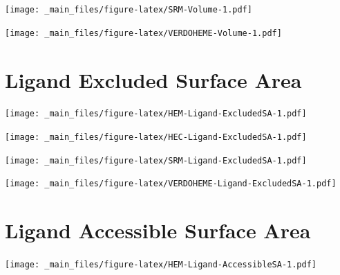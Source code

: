 \documentclass[a4paper, nobind]{templates/ociamthesis}
\let\origfigure\figure
\let\endorigfigure\endfigure
\renewenvironment{figure}[1][2] {
    \expandafter\origfigure\expandafter[H]
} {
    \endorigfigure
}
\begin{document}
\begin{figure}
\centering
\texttt{[image: \_main\_files/figure-latex/SRM-Volume-1.pdf]}
\caption{\label{fig:SRM-Volume}SRM: Volume}
\end{figure}

\begin{figure}
\centering
\texttt{[image: \_main\_files/figure-latex/VERDOHEME-Volume-1.pdf]}
\caption{\label{fig:VERDOHEME-Volume}VERDOHEME: Volume}
\end{figure}

\hypertarget{figs-ligExcSA}{%
\section{Ligand Excluded Surface Area}\label{figs-ligExcSA}}

\begin{figure}
\centering
\texttt{[image: \_main\_files/figure-latex/HEM-Ligand-ExcludedSA-1.pdf]}
\caption{\label{fig:HEM-Ligand-ExcludedSA}HEM: Ligand Excluded Suface Area}
\end{figure}

\begin{figure}
\centering
\texttt{[image: \_main\_files/figure-latex/HEC-Ligand-ExcludedSA-1.pdf]}
\caption{\label{fig:HEC-Ligand-ExcludedSA}HEC: Ligand Excluded Suface Area}
\end{figure}

\begin{figure}
\centering
\texttt{[image: \_main\_files/figure-latex/SRM-Ligand-ExcludedSA-1.pdf]}
\caption{\label{fig:SRM-Ligand-ExcludedSA}SRM: Ligand Excluded Suface Area}
\end{figure}

\begin{figure}
\centering
\texttt{[image: \_main\_files/figure-latex/VERDOHEME-Ligand-ExcludedSA-1.pdf]}
\caption{\label{fig:VERDOHEME-Ligand-ExcludedSA}VERDOHEME: Ligand Excluded Suface Area}
\end{figure}

\hypertarget{figs-ligAccSA}{%
\section{Ligand Accessible Surface Area}\label{figs-ligAccSA}}

\begin{figure}
\centering
\texttt{[image: \_main\_files/figure-latex/HEM-Ligand-AccessibleSA-1.pdf]}
\caption{\label{fig:HEM-Ligand-AccessibleSA}HEM: Ligand Accessible Surface Area}
\end{figure}
\end{document}
